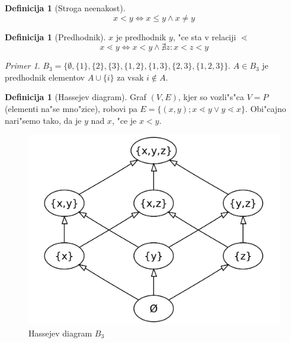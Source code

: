 \documentclass[a4paper,12pt]{article}
\theoremstyle{definition}
\newtheorem{defn}[counter]{Definicija}
\theoremstyle{remark}
\newtheorem*{ex}{Primer}
\begin{document}
\begin{defn}[Stroga neenakost]
	\[ x < y \iff x \leqslant y \land x \neq y\]
\end{defn}
\begin{defn}[Predhodnik]
	$x$ je predhodnik $y$, "ce sta v relaciji $\lessdot$
	\[ x \lessdot y \iff x < y \land \nexists z: x < z < y\]
\end{defn}
\begin{ex}
	$B_3 = \{\emptyset, \{1\}, \{2\}, \{3\}, \{1,2\}, \{1,3\}, \{2,3\}, \{1,2,3\}\}$. $A \in B_3$ je predhodnik elementov $A \cup \{i\}$ za vsak $i \notin A$.
\end{ex}

\begin{defn}[Hassejev diagram]
	Graf $(V, E)$, kjer so vozli"s"ca $V=P$ (elementi na"se mno"zice), robovi pa $E=\{(x,y); x \lessdot y \lor y \lessdot x\}$. Obi"cajno nari"semo tako, da je $y$ nad $x$, "ce je $x < y$.
\end{defn}
\begin{figure}[h!]
	\centering
	\includegraphics[scale=0.1]{hasse_b3}
	\caption{Hassejev diagram $B_3$}
\end{figure}
\end{document}
